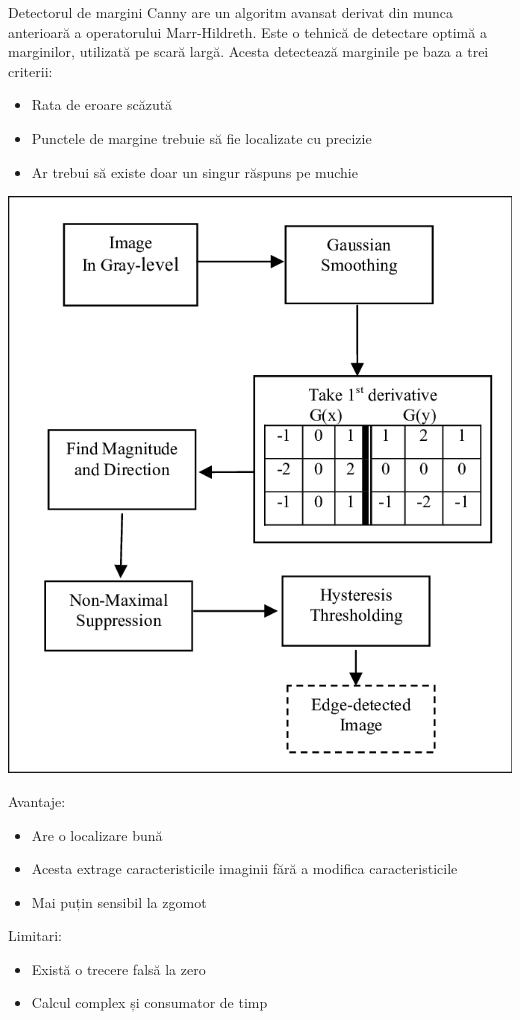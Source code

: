 \documentclass[10pt]{article}
\begin{document}
\> Detectorul de margini Canny are un algoritm avansat derivat din munca anterioară a operatorului Marr-Hildreth.
Este o tehnică de detectare optimă a marginilor, utilizată pe scară largă. Acesta detectează marginile pe baza a trei criterii: 

\begin{itemize}

  \item Rata de eroare scăzută 
  \item Punctele de margine trebuie să fie localizate cu precizie 
  \item Ar trebui să existe doar un singur răspuns pe muchie

\end{itemize}

\begin{center}

  \includegraphics[scale=0.3]{canny}
  
\end{center}

\> Avantaje:
\begin{itemize}

  \item Are o localizare bună
  \item Acesta extrage caracteristicile imaginii fără a modifica caracteristicile
  \item Mai puțin sensibil la zgomot

\end{itemize}

\> Limitari:
\begin{itemize}

  \item Există o trecere falsă la zero
  \item Calcul complex și consumator de timp
  
\end{itemize}

\newpage
\end{document}
